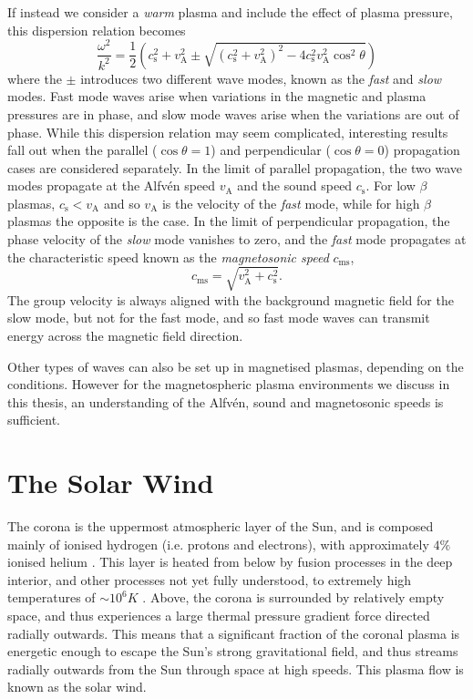 If instead we consider a \textit{warm} plasma and include the effect of plasma pressure, this dispersion relation becomes
\begin{equation}
\frac{\omega^2}{k^2} = \frac{1}{2}\left(c_\mathrm{s}^2+v_\mathrm{A}^2\pm\sqrt{(c_\mathrm{s}^2+v_\mathrm{A}^2)^2-4c_\mathrm{s}^2v_\mathrm{A}^2\cos^2\theta}\right)
\end{equation}
where the $\pm$ introduces two different wave modes, known as the \textit{fast} and \textit{slow} modes. Fast mode waves arise when variations in the magnetic and plasma pressures are in phase, and slow mode waves arise when the variations are out of phase. While this dispersion relation may seem complicated, interesting results fall out when the parallel ($\cos\theta = 1$) and perpendicular ($\cos\theta = 0$) propagation cases are considered separately. In the limit of parallel propagation, the two wave modes propagate at the Alfv\'en speed $v_\mathrm{A}$ and the sound speed $c_\mathrm{s}$. For low $\beta$ plasmas, $c_\mathrm{s}<v_\mathrm{A}$ and so $v_\mathrm{A}$ is the velocity of the \textit{fast} mode, while for high $\beta$ plasmas the opposite is the case. In the limit of perpendicular propagation, the phase velocity of the \textit{slow} mode vanishes to zero, and the \textit{fast} mode propagates at the characteristic speed known as the \textit{magnetosonic speed} $c_\mathrm{ms}$,
\begin{equation}
c_\mathrm{ms} = \sqrt{v_\mathrm{A}^2+c_\mathrm{s}^2}.
\end{equation}
The group velocity is always aligned with the background magnetic field for the slow mode, but not for the fast mode, and so fast mode waves can transmit energy across the magnetic field direction. 
 
Other types of waves can also be set up in magnetised plasmas, depending on the conditions. However for the magnetospheric plasma environments we discuss in this thesis, an understanding of the Alfv\'en, sound and magnetosonic speeds is sufficient.

\section{The Solar Wind} \label{intro:sec:solarwind}
The corona is the uppermost atmospheric layer of the Sun, and is composed mainly of ionised hydrogen (i.e. protons and electrons), with approximately $4\%$ ionised helium \citep{robbins1970}. This layer is heated from below by fusion processes in the deep interior, and other processes not yet fully understood, to extremely high temperatures of ${\sim}10^6\si{K}$ \citep{warren2009}. Above, the corona is surrounded by relatively empty space, and thus experiences a large thermal pressure gradient force directed radially outwards. This means that a significant fraction of the coronal plasma is energetic enough to escape the Sun's strong gravitational field, and thus streams radially outwards from the Sun through space at high speeds. This plasma flow is known as the solar wind.

